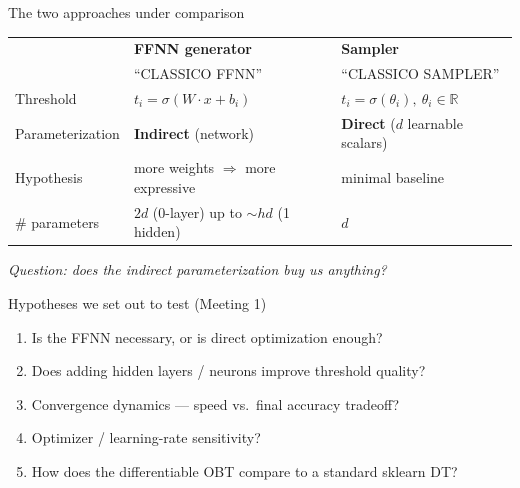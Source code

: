 \documentclass[aspectratio=169,10pt]{beamer}
\begin{document}
\begin{frame}{The two approaches under comparison}
  \centering
  \begin{tabular}{@{}lll@{}}
    \toprule
                       & \textbf{FFNN generator}                  & \textbf{Sampler}                                   \\
                       & ``CLASSICO FFNN''                        & ``CLASSICO SAMPLER''                               \\
    \midrule
    Threshold          & $t_i = \sigma(W \cdot x + b_i)$          & $t_i = \sigma(\theta_i),\ \theta_i \in \mathbb{R}$ \\
    Parameterization   & \textbf{Indirect} (network)              & \textbf{Direct} ($d$ learnable scalars)            \\
    Hypothesis         & more weights $\Rightarrow$ more expressive & minimal baseline                                 \\
    \# parameters      & $2d$ (0-layer) up to $\sim hd$ (1 hidden) & $d$                                                \\
    \bottomrule
  \end{tabular}

  \bigskip
  \begin{center}
    \emph{Question: does the indirect parameterization buy us anything?}
  \end{center}
\end{frame}

\begin{frame}{Hypotheses we set out to test (Meeting 1)}
  \begin{enumerate}
    \item[\textbf{Q1.}] Is the FFNN necessary, or is direct optimization enough?
    \item[\textbf{Q2.}] Does adding hidden layers / neurons improve threshold quality?
    \item[\textbf{Q3.}] Convergence dynamics --- speed vs.\ final accuracy tradeoff?
    \item[\textbf{Q4.}] Optimizer / learning-rate sensitivity?
    \item[\textbf{Q5.}] How does the differentiable OBT compare to a standard sklearn DT?
  \end{enumerate}
\end{frame}
\end{document}
